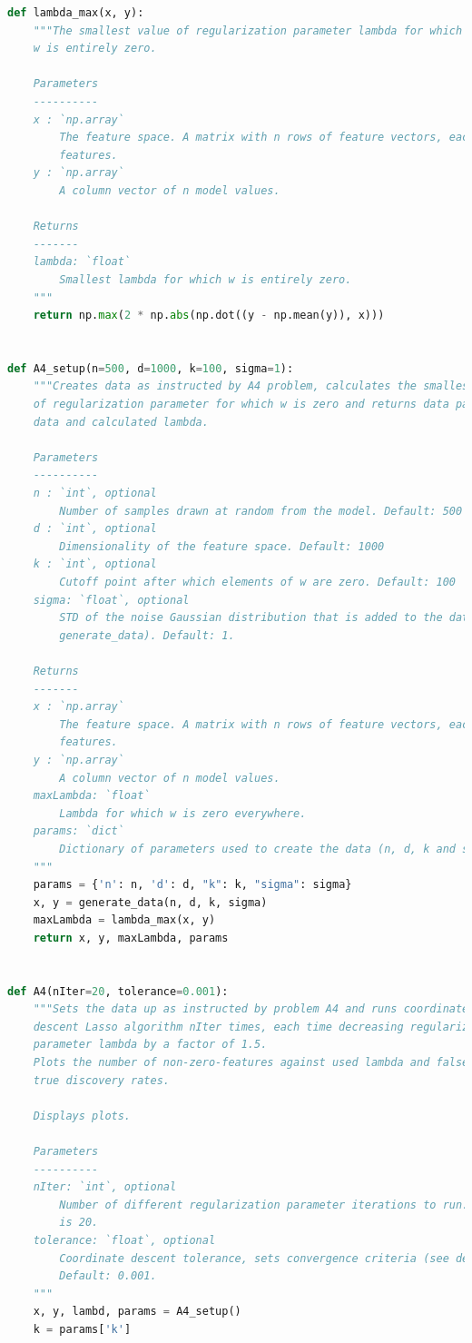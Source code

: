 \documentclass{article}
\newcommand{\1}{\mathbf{1}}
\begin{document}
\begin{enumerate}
\begin{lstlisting}[language=Python]
def lambda_max(x, y):
    """The smallest value of regularization parameter lambda for which the
    w is entirely zero.

    Parameters
    ----------
    x : `np.array`
        The feature space. A matrix with n rows of feature vectors, each with d
        features.
    y : `np.array`
        A column vector of n model values.

    Returns
    -------
    lambda: `float`
        Smallest lambda for which w is entirely zero.
    """
    return np.max(2 * np.abs(np.dot((y - np.mean(y)), x)))


def A4_setup(n=500, d=1000, k=100, sigma=1):
    """Creates data as instructed by A4 problem, calculates the smallest value
    of regularization parameter for which w is zero and returns data parameters,
    data and calculated lambda.

    Parameters
    ----------
    n : `int`, optional
        Number of samples drawn at random from the model. Default: 500
    d : `int`, optional
        Dimensionality of the feature space. Default: 1000
    k : `int`, optional
        Cutoff point after which elements of w are zero. Default: 100
    sigma: `float`, optional
        STD of the noise Gaussian distribution that is added to the data (see
        generate_data). Default: 1.

    Returns
    -------
    x : `np.array`
        The feature space. A matrix with n rows of feature vectors, each with d
        features.
    y : `np.array`
        A column vector of n model values.
    maxLambda: `float`
        Lambda for which w is zero everywhere.
    params: `dict`
        Dictionary of parameters used to create the data (n, d, k and sigma).
    """
    params = {'n': n, 'd': d, "k": k, "sigma": sigma}
    x, y = generate_data(n, d, k, sigma)
    maxLambda = lambda_max(x, y)
    return x, y, maxLambda, params


def A4(nIter=20, tolerance=0.001):
    """Sets the data up as instructed by problem A4 and runs coordinate
    descent Lasso algorithm nIter times, each time decreasing regularization
    parameter lambda by a factor of 1.5.
    Plots the number of non-zero-features against used lambda and false vs
    true discovery rates.

    Displays plots.

    Parameters
    ----------
    nIter: `int`, optional
        Number of different regularization parameter iterations to run. Default
        is 20.
    tolerance: `float`, optional
        Coordinate descent tolerance, sets convergence criteria (see descent).
        Default: 0.001.
    """
    x, y, lambd, params = A4_setup()
    k = params['k']


\end{lstlisting}
\end{enumerate}
\end{document}
